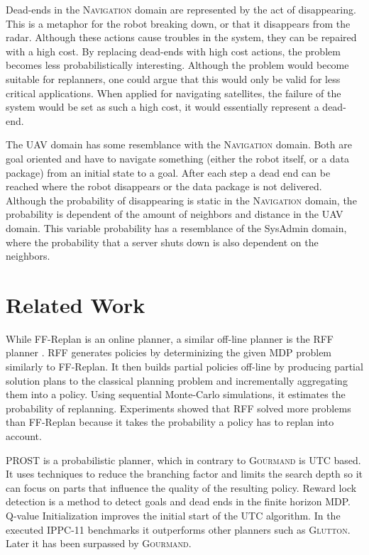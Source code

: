 \documentclass[runningheads,a4paper]{llncs}
\begin{document}
Dead-ends in the \textsc{Navigation} domain are represented by the act of disappearing.
This is a metaphor for the robot breaking down, or that it
disappears from the radar. Although these actions cause troubles in the system, they can be repaired with a high cost. By replacing dead-ends with high cost actions, the problem becomes less probabilistically interesting.
Although the problem would become suitable for replanners, one could argue that this would only be valid for less critical applications. When applied for
navigating satellites, the failure of the system would be set as such a high cost, it would essentially represent a dead-end.

The UAV domain has some resemblance with the \textsc{Navigation} domain. Both are goal
oriented and have to navigate something (either the robot itself, or a data
package) from an initial state to a goal. After each step a dead end can
be reached where the robot disappears or the data package is not delivered.
Although the probability of disappearing is static in the \textsc{Navigation} domain, the probability is dependent of the
amount of neighbors and distance in the UAV domain. This variable probability has a resemblance
of the SysAdmin domain, where the probability that a server shuts down is also
dependent on the neighbors.



\section{Related Work}
\label{sec:related}

While FF-Replan is an online planner, a similar off-line planner is the RFF planner
\cite{teichteil2010incremental}. RFF generates policies by determinizing the
given MDP problem similarly to FF-Replan. It then builds partial policies off-line by producing partial
solution plans to the classical planning problem and incrementally aggregating
them into a policy. Using sequential Monte-Carlo simulations, it estimates the
probability of replanning. Experiments showed that RFF solved more problems
than FF-Replan because it takes the probability a policy has to replan into
account.

PROST \cite{keller2012prost} is a probabilistic planner, which in contrary to
\textsc{Gourmand} is UTC based. It uses techniques to reduce the branching
factor and limits the search depth so it can focus on parts that
influence the quality of the resulting policy. Reward lock detection is a
method to detect goals and dead ends in the finite horizon MDP\@. Q-value
Initialization improves the initial start of the UTC algorithm. In the executed
IPPC-11 benchmarks it outperforms other planners such as \textsc{Glutton}.
Later it has been surpassed by \textsc{Gourmand}.
\end{document}
